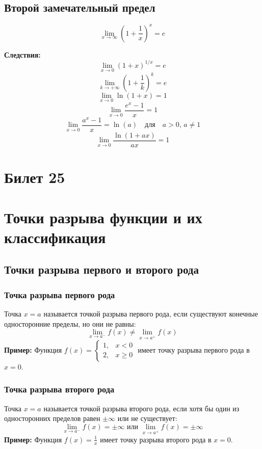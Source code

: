 \documentclass{article}
\begin{document}
\subsection*{Второй замечательный предел}
\[
\lim_{x \to \infty} \left(1 + \frac{1}{x}\right)^x = e
\]

\textbf{Следствия:}
\[
\lim_{x \to 0} (1 + x)^{1/x} = e
\]
\[
\lim_{k \to +\infty} \left(1 + \frac{1}{k}\right)^k = e
\]
\[
\lim_{x \to 0} \ln(1 + x) = 1
\]
\[
\lim_{x \to 0} \frac{e^x - 1}{x} = 1
\]
\[
\lim_{x \to 0} \frac{a^x - 1}{x} = \ln(a) \quad \text{для} \quad a > 0, \, a \neq 1
\]
\[
\lim_{x \to 0} \frac{\ln(1 + ax)}{ax} = 1
\]

\section{Билет 25}

\section*{Точки разрыва функции и их классификация}

\subsection*{Точки разрыва первого и второго рода}

\subsubsection*{Точка разрыва первого рода}
Точка $x = a$ называется точкой разрыва первого рода, если существуют конечные односторонние пределы, но они не равны:
\[
\lim_{x \to a^-} f(x) \neq \lim_{x \to a^+} f(x)
\]
\textbf{Пример:} Функция $f(x) = \begin{cases} 
1, & x < 0 \\
2, & x \geq 0 
\end{cases}$ имеет точку разрыва первого рода в $x = 0$.

\subsubsection*{Точка разрыва второго рода}
Точка $x = a$ называется точкой разрыва второго рода, если хотя бы один из односторонних пределов равен $\pm \infty$ или не существует:
\[
\lim_{x \to a^-} f(x) = \pm \infty \text{ или } \lim_{x \to a^+} f(x) = \pm \infty
\]
\textbf{Пример:} Функция $f(x) = \frac{1}{x}$ имеет точку разрыва второго рода в $x = 0$.
\end{document}

